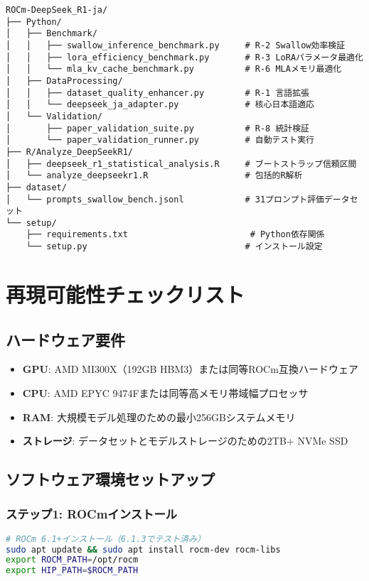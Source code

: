 \documentclass[12pt,a4paper]{article}
\begin{document}
\begin{lstlisting}[basicstyle=\ttfamily\footnotesize]
ROCm-DeepSeek_R1-ja/
├── Python/
│   ├── Benchmark/
│   │   ├── swallow_inference_benchmark.py     # R-2 Swallow効率検証
│   │   ├── lora_efficiency_benchmark.py       # R-3 LoRAパラメータ最適化
│   │   └── mla_kv_cache_benchmark.py          # R-6 MLAメモリ最適化
│   ├── DataProcessing/
│   │   ├── dataset_quality_enhancer.py        # R-1 言語拡張
│   │   └── deepseek_ja_adapter.py             # 核心日本語適応
│   └── Validation/
│       ├── paper_validation_suite.py          # R-8 統計検証
│       └── paper_validation_runner.py         # 自動テスト実行
├── R/Analyze_DeepSeekR1/
│   ├── deepseek_r1_statistical_analysis.R     # ブートストラップ信頼区間
│   └── analyze_deepseekr1.R                   # 包括的R解析
├── dataset/
│   └── prompts_swallow_bench.jsonl            # 31プロンプト評価データセット
└── setup/
    ├── requirements.txt                        # Python依存関係
    └── setup.py                               # インストール設定
\end{lstlisting}

\section{再現可能性チェックリスト}

\subsection{ハードウェア要件}

\begin{itemize}
\item \textbf{GPU}: AMD MI300X（192GB HBM3）または同等ROCm互換ハードウェア
\item \textbf{CPU}: AMD EPYC 9474Fまたは同等高メモリ帯域幅プロセッサ
\item \textbf{RAM}: 大規模モデル処理のための最小256GBシステムメモリ
\item \textbf{ストレージ}: データセットとモデルストレージのための2TB+ NVMe SSD
\end{itemize}

\subsection{ソフトウェア環境セットアップ}

\subsubsection{ステップ1: ROCmインストール}
\begin{lstlisting}[language=bash]
# ROCm 6.1+インストール（6.1.3でテスト済み）
sudo apt update && sudo apt install rocm-dev rocm-libs
export ROCM_PATH=/opt/rocm
export HIP_PATH=$ROCM_PATH
\end{lstlisting}
\end{document}
